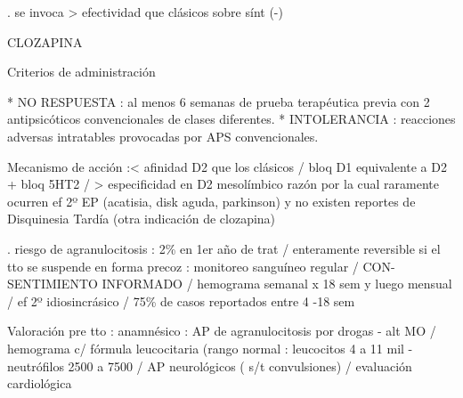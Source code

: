 \documentclass{scrbook}
\begin{document}
. se invoca > efectividad que clásicos sobre sínt (-)

CLOZAPINA

Criterios de administración

* NO RESPUESTA : al menos 6 semanas de prueba terapéutica previa con 2 antipsicóticos convencionales de clases diferentes.
* INTOLERANCIA : reacciones adversas intratables provocadas por APS convencionales.

Mecanismo de acción :< afinidad D2 que los clásicos / bloq D1 equivalente a D2 + bloq 5HT2 / > especificidad en D2 mesolímbico razón por la cual raramente ocurren ef 2º EP (acatisia, disk aguda, parkinson) y no existen reportes de Disquinesia Tardía (otra indicación de clozapina)

. riesgo de agranulocitosis : 2\% en 1er año de trat / enteramente reversible si el tto se suspende en forma precoz : monitoreo sanguíneo regular / CON-SENTIMIENTO INFORMADO / hemograma semanal x 18 sem y luego mensual / ef 2º idiosincrásico / 75\% de casos reportados entre 4 -18 sem

Valoración pre tto : anamnésico : AP de agranulocitosis por drogas - alt MO / hemograma c/ fórmula leucocitaria (rango normal : leucocitos 4 a 11 mil - neutrófilos 2500 a 7500 / AP neurológicos ( s/t convulsiones) / evaluación cardiológica
\end{document}
